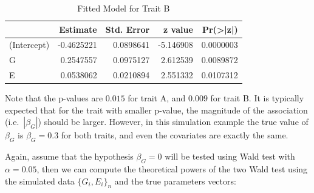 \documentclass[
]{article}
\newenvironment{Shaded}{\begin{snugshade}}{\end{snugshade}}
\newcommand{\AttributeTok}[1]{\textcolor[rgb]{0.77,0.63,0.00}{#1}}
\newcommand{\DecValTok}[1]{\textcolor[rgb]{0.00,0.00,0.81}{#1}}
\newcommand{\DocumentationTok}[1]{\textcolor[rgb]{0.56,0.35,0.01}{\textbf{\textit{#1}}}}
\newcommand{\FunctionTok}[1]{\textcolor[rgb]{0.00,0.00,0.00}{#1}}
\newcommand{\NormalTok}[1]{#1}
\newcommand{\OtherTok}[1]{\textcolor[rgb]{0.56,0.35,0.01}{#1}}
\newcommand{\SpecialCharTok}[1]{\textcolor[rgb]{0.00,0.00,0.00}{#1}}
\newcommand{\StringTok}[1]{\textcolor[rgb]{0.31,0.60,0.02}{#1}}
\begin{document}
\begin{Shaded}
\end{Shaded}

\begin{table}[H]

\caption{\label{tab:unnamed-chunk-1}Fitted Model for Trait B}
\centering
\fontsize{10}{12}\selectfont
\begin{tabular}[t]{l|r|r|r|r}
\hline
  & Estimate & Std. Error & z value & Pr(>|z|)\\
\hline
(Intercept) & -0.4625221 & 0.0898641 & -5.146908 & 0.0000003\\
\hline
G & 0.2547557 & 0.0975127 & 2.612539 & 0.0089872\\
\hline
E & 0.0538062 & 0.0210894 & 2.551332 & 0.0107312\\
\hline
\end{tabular}
\end{table}

Note that the p-values are \(0.015\) for trait A, and \(0.009\) for
trait B. It is typically expected that for the trait with smaller
p-value, the magnitude of the association (i.e.~\(|\beta_G|\)) should be
larger. However, in this simulation example the true value of
\(\beta_G\) is \(\beta_G=0.3\) for both traits, and even the covariates
are exactly the same.

Again, assume that the hypothesis \(\beta_G = 0\) will be tested using
Wald test with \(\alpha=0.05\), then we can compute the theoretical
powers of the two Wald test using the simulated data \(\{G_i,E_i\}_n\)
and the true parameters vectors:
\end{document}

